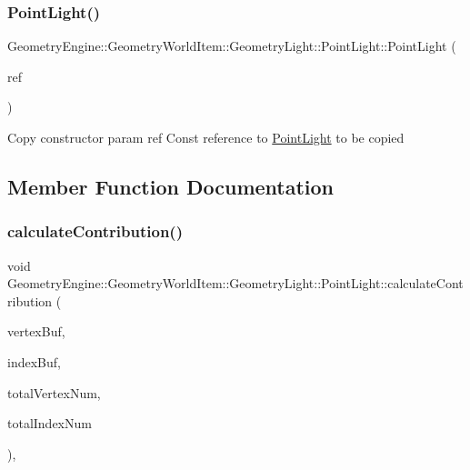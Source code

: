 \subsubsection{\texorpdfstring{PointLight()}{PointLight()}\hspace{0.1cm}{\footnotesize\ttfamily [2/2]}}
{\footnotesize\ttfamily Geometry\+Engine\+::\+Geometry\+World\+Item\+::\+Geometry\+Light\+::\+Point\+Light\+::\+Point\+Light (\begin{DoxyParamCaption}\item[{const \mbox{\hyperlink{class_geometry_engine_1_1_geometry_world_item_1_1_geometry_light_1_1_point_light}{Point\+Light}} \&}]{ref }\end{DoxyParamCaption})\hspace{0.3cm}{\ttfamily [inline]}}

Copy constructor param ref Const reference to \mbox{\hyperlink{class_geometry_engine_1_1_geometry_world_item_1_1_geometry_light_1_1_point_light}{Point\+Light}} to be copied 

\subsection{Member Function Documentation}
\mbox{\label{class_geometry_engine_1_1_geometry_world_item_1_1_geometry_light_1_1_point_light_aa30244fd20e61fdfe1ac1d85c99fd154}} 
\subsubsection{\texorpdfstring{calculateContribution()}{calculateContribution()}}
{\footnotesize\ttfamily void Geometry\+Engine\+::\+Geometry\+World\+Item\+::\+Geometry\+Light\+::\+Point\+Light\+::calculate\+Contribution (\begin{DoxyParamCaption}\item[{Q\+Open\+G\+L\+Buffer $\ast$}]{vertex\+Buf,  }\item[{Q\+Open\+G\+L\+Buffer $\ast$}]{index\+Buf,  }\item[{unsigned int}]{total\+Vertex\+Num,  }\item[{unsigned int}]{total\+Index\+Num }\end{DoxyParamCaption})\hspace{0.3cm}{\ttfamily [protected]}, {\ttfamily [virtual]}}

